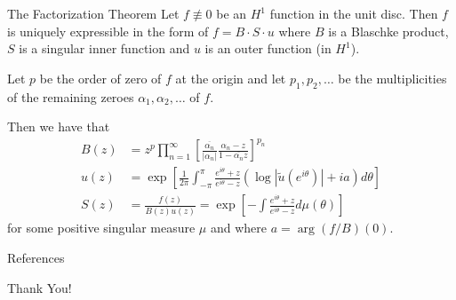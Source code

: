 \documentclass{beamer}
\numberwithin{equation}{subsection}
\newcommand{\abs}[1]{\left\lvert #1 \right\rvert}
\begin{document}
    \begin{frame}{The Factorization Theorem}
    Let $f \not\equiv 0$ be an $H^{1}$ function in the unit disc. Then $f$ is uniquely expressible in the form of $f=B\cdot S \cdot u$ where $B$ is a Blaschke product, $S$ is a singular inner function and $u$ is an outer function (in $H^{1}$).	
    \pause

    Let $p$ be the order of zero of $f$ at the origin and let $p_{1}, p_{2}, \ldots$ be the multiplicities of the remaining zeroes $\alpha_{1}, \alpha_{2}, \ldots$ of $f$. 

Then we have that
\begin{align*}
    B\left( z \right) &= z^{p} \prod_{n=1}^{\infty} \left[ \frac{\overline{\alpha_{n}}}{\abs{\alpha_{n}}} \frac{\alpha_{n} - z}{ 1- \overline{\alpha_{n}}z} \right]^{p_{n}} \\
    u\left( z \right) &=  \exp \left[ \frac{1}{2\pi} \int_{-\pi}^{\pi} \frac{e^{i\theta} + z}{ e^{i\theta} -z} \left( \log \abs{\tilde{u}\left( e^{i\theta} \right)} + ia \right) d\theta \right]  \\
    S\left( z \right) &= \frac{f\left( z \right)}{B\left( z \right) u\left( z \right)} = \exp \left[ -\int \frac{e^{i\theta} +z}{ e^{i\theta} - z} d\mu \left( \theta \right) \right]
\end{align*}
for some positive singular measure $\mu$ and where $a= \arg \left( f/B \right) \left( 0 \right)$.
    \end{frame}

    \begin{frame}[allowframebreaks]{References}	\nocite{*}
    \printbibliography
\end{frame}

\begin{frame}
    \begin{center}
    \huge Thank You!
   \thispagestyle{empty} 
\end{center}
\end{frame}
\end{document}

